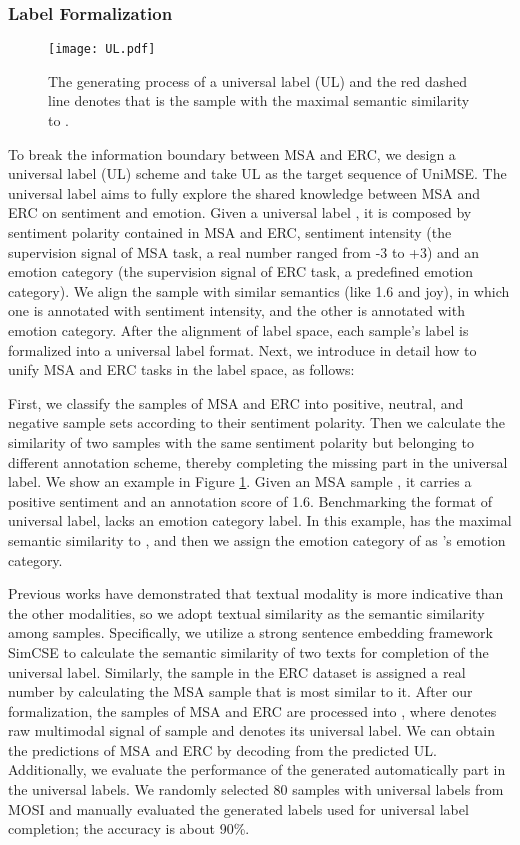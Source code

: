 \documentclass[11pt]{article}
\begin{document}
\subsubsection{Label Formalization}
\begin{figure}[t]
\centerline{\texttt{[image: UL.pdf]}}
\caption{The generating process of a universal label (UL) and the red dashed line denotes that  is the sample with the maximal semantic similarity to .}
\label{fig:UL}
\end{figure}
To break the information boundary between MSA and ERC, we design a universal label (UL) scheme and take UL as the target sequence of UniMSE. The universal label aims to fully explore the shared knowledge between MSA and ERC on sentiment and emotion. Given a universal label , it is composed by sentiment polarity  contained in MSA and ERC, sentiment intensity  (the supervision signal of MSA task, a real number ranged from -3 to +3) and an emotion category  (the supervision signal of ERC task, a predefined emotion category). 
We align the sample with similar semantics (like 1.6 and joy), in which one is annotated with sentiment intensity, and the other is annotated with emotion category. After the alignment of label space, each sample's label is formalized into a universal label format. Next, we introduce in detail how to unify MSA and ERC tasks in the label space, as follows:


First, we classify the samples of MSA and ERC into positive, neutral, and negative sample sets according to their sentiment polarity. Then we calculate the similarity of two samples with the same sentiment polarity but belonging to different annotation scheme, thereby completing the missing part in the universal label. We show an example in Figure \ref{fig:UL}. Given an MSA sample , it carries a positive sentiment and an annotation score of 1.6. Benchmarking the format of universal label,  lacks an emotion category label. In this example,  has the maximal semantic similarity to , and then we assign the emotion category of  as 's emotion category. 

Previous works \cite{DBLP:conf/acl/TsaiBLKMS19,DBLP:conf/naacl/YangWYZRZPM21} have demonstrated that textual modality is more indicative than the other modalities, so we adopt textual similarity as the semantic similarity among samples. Specifically, we utilize a strong sentence embedding framework SimCSE \cite{DBLP:conf/emnlp/GaoYC21} to calculate the semantic similarity of two texts for completion of the universal label. Similarly, the sample in the ERC dataset is assigned a real number by calculating the MSA sample that is most similar to it. After our formalization, the samples of MSA and ERC are processed into , where  denotes raw multimodal signal of sample  and  denotes its universal label. We can obtain the predictions of MSA and ERC by decoding from the predicted UL.
Additionally, we evaluate the performance of the generated automatically part in the universal labels. We randomly selected 80 samples with universal labels from MOSI and manually evaluated the generated labels used for universal label completion; the accuracy is about 90\%.
\end{document}
